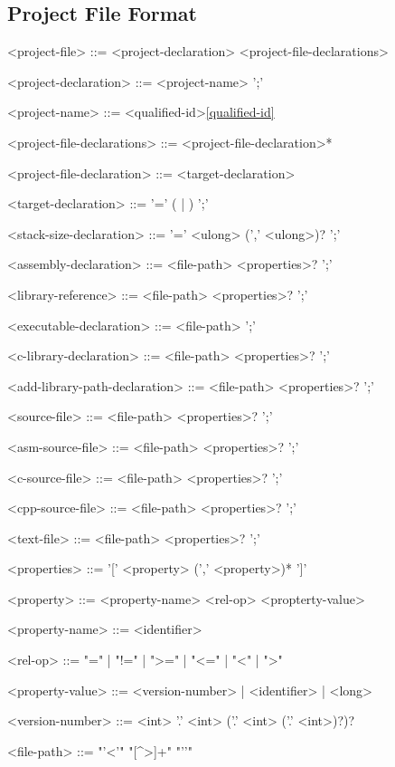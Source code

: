 \documentclass[a4paper,oneside,11pt]{article}
\begin{document}
\subsection{Project File Format}

\begin{grammar}
<project-file> ::= <project-declaration> <project-file-declarations>

<project-declaration> ::=  <project-name> ';'

<project-name> ::= <qualified-id>\ref{qualified-id}

<project-file-declarations> ::= <project-file-declaration>*

<project-file-declaration> ::= <target-declaration>

<target-declaration> ::=  '=' ( | ) ';'

<stack-size-declaration> ::=  '=' <ulong> (',' <ulong>)? ';'

<assembly-declaration> ::=  <file-path> <properties>? ';'

<library-reference> ::=  <file-path> <properties>? ';'

<executable-declaration> ::=  <file-path> ';'

<c-library-declaration> ::=  <file-path> <properties>? ';'

<add-library-path-declaration> ::=  <file-path> <properties>? ';'

<source-file> ::=  <file-path> <properties>? ';'

<asm-source-file> ::=  <file-path> <properties>? ';'

<c-source-file> ::=  <file-path> <properties>? ';'

<cpp-source-file> ::=  <file-path> <properties>? ';'

<text-file> ::=  <file-path> <properties>? ';'

<properties> ::= '[' <property> (',' <property>)* ']'

<property> ::= <property-name> <rel-op> <propterty-value>

<property-name> ::= <identifier>

<rel-op> ::= "=" | "!=" | ">=" | "<=" | "<" | ">"

<property-value> ::= <version-number> | <identifier> | <long>

<version-number> ::= <int> '.' <int> ('.' <int> ('.' <int>)?)?

<file-path> ::= "'<'" "[^>]+" "'\>'"

\end{grammar}
\end{document}
